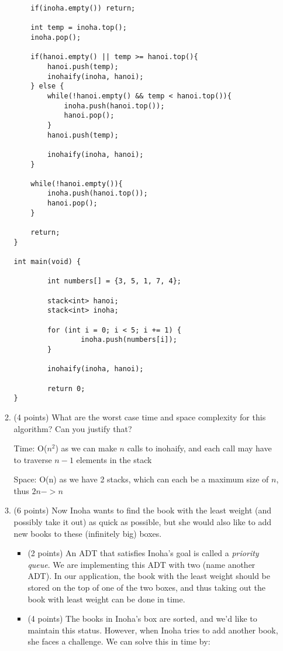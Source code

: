 \documentclass[11pt]{article}
\newcommand{\fillinlarge}[1]{\fbox{\LARGE{\textbf{#1}}}}
\newcommand{\fillinsmall}[1]{\fbox{\text{#1}}}
\begin{document}
\begin{enumerate}
\begin{enumerate}
\begin{lstlisting}
	if(inoha.empty()) return;

	int temp = inoha.top();
	inoha.pop();
	
	if(hanoi.empty() || temp >= hanoi.top(){
		hanoi.push(temp);
		inohaify(inoha, hanoi);
	} else {
		while(!hanoi.empty() && temp < hanoi.top()){
			inoha.push(hanoi.top());
			hanoi.pop();
		}
		hanoi.push(temp);
		
		inohaify(inoha, hanoi);
	}

	while(!hanoi.empty()){
		inoha.push(hanoi.top());   
		hanoi.pop();
	}
    
	return; 
}

int main(void) {

        int numbers[] = {3, 5, 1, 7, 4};

        stack<int> hanoi;
        stack<int> inoha;

        for (int i = 0; i < 5; i += 1) {
                inoha.push(numbers[i]);
        }

        inohaify(inoha, hanoi);

        return 0;
}
\end{lstlisting}

\item (4 points) What are the worst case time and space complexity for this algorithm? Can you justify that?

\begin{framed}Time:  O($n^2$) as we can make $n$ calls to inohaify, and each call may have to traverse $n - 1$ elements in the stack \end{framed}
\begin{framed}Space: O(n) as we have 2 stacks, which can each be a maximum size of $n$, thus $2n -> n$\end{framed}
\newpage

\item (6 points) Now Inoha wants to find the book with the least weight (and possibly take it out) as quick as possible, but she would also like to add new books to these (infinitely big) boxes. 
\begin{itemize}
\item (2 points) An ADT that satisfies Inoha's goal is called a {\em priority queue}. We are implementing this ADT with two (name another ADT)\fillinsmall{stacks}. In our application, the book with the least weight should be stored on the top of one of the two boxes, and thus taking out the book with least weight can be done in \fillinlarge{O(1)} time. 
\item (4 points) The books in Inoha's box are sorted, and we'd like to maintain this status. However, when Inoha tries to add another book, she faces a challenge. We can solve this in \fillinlarge{O(n)} time by: 


\end{itemize}
\end{enumerate}
\end{enumerate}
\end{document}
